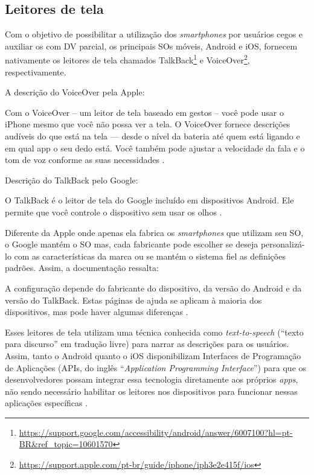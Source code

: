 \subsection{Leitores de tela}

Com o objetivo de possibilitar a utilização dos \emph{smartphones} por usuários cegos e auxiliar os com DV parcial, os principais SOs móveis, Android e iOS,
fornecem nativamente os leitores de tela chamados TalkBack\footnote{\url{https://support.google.com/accessibility/android/answer/6007100?hl=pt-BR&ref_topic=10601570}}
e VoiceOver\footnote{\url{https://support.apple.com/pt-br/guide/iphone/iph3e2e415f/ios}}, respectivamente.

A descrição do VoiceOver pela Apple:

\begin{citacao}
    Com o VoiceOver – um leitor de tela baseado em gestos – você pode usar o iPhone mesmo que você não possa ver a tela.
    O VoiceOver fornece descrições audíveis do que está na tela — desde o nível da bateria até quem está ligando e em qual
    app o seu dedo está. Você também pode ajustar a velocidade da fala e o tom de voz conforme as suas necessidades \cite{VoiceOver2021}.
\end{citacao}

Descrição do TalkBack pelo Google:

\begin{citacao}
    O TalkBack é o leitor de tela do Google incluído em dispositivos Android.
    Ele permite que você controle o dispositivo sem usar os olhos \cite{TalkBak2021}.
\end{citacao}

Diferente da Apple onde apenas ela fabrica os \emph{smartphones} que utilizam seu SO, o Google mantém o SO mas, cada fabricante pode escolher se
deseja personalizá-lo com as características da marca ou se mantém o sistema fiel as definições padrões. Assim, a documentação ressalta:

\begin{citacao}
    A configuração depende do fabricante do dispositivo, da versão do Android e da versão do TalkBack.
    Estas páginas de ajuda se aplicam à maioria dos dispositivos, mas pode haver algumas diferenças \cite{TalkBak2021}.
\end{citacao}

Esses leitores de tela utilizam uma técnica conhecida como \emph{text-to-speech} (``texto para discurso'' em tradução livre) para narrar as descrições para
os usuários. Assim, tanto o Android quanto o iOS disponibilizam Interfaces de Programação de Aplicações
(APIs, do inglês ``\emph{Application Programming Interface}'') para que os desenvolvedores possam integrar essa tecnologia diretamente aos
próprios \emph{apps}, não sendo necessário habilitar os leitores nos dispositivos para funcionar nessas aplicações específicas
\cite{Heesook2017,Biase2018,Oliveira2019,Caballero2020}.

